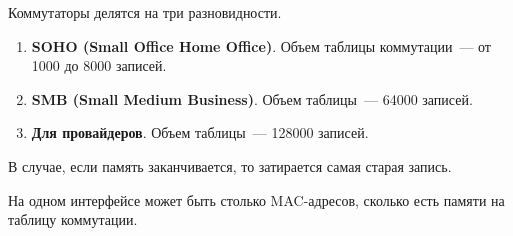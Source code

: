 Коммутаторы делятся на три разновидности.

\begin{enumerate}
    \item \textbf{SOHO (Small Office Home Office)}. Объем таблицы коммутации~--- от \num{1000} до \num{8000} записей.
    \item \textbf{SMB (Small Medium Business)}. Объем таблицы~--- \num{64000} записей.
    \item \textbf{Для провайдеров}. Объем таблицы~--- \num{128000} записей.
\end{enumerate}

В случае, если память заканчивается, то затирается самая старая запись.

На одном интерфейсе может быть столько MAC-адресов, сколько есть памяти на таблицу коммутации.